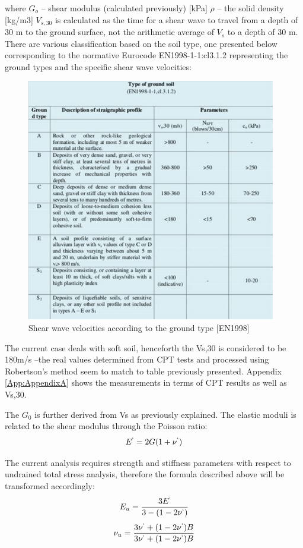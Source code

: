 \documentclass[10pt,a4paper]{report}
\begin{document}
where
$G_o$ – shear modulus (calculated previously) [kPa]
$\rho$ – the solid density [kg/m3]
$V_{s,30}$ is calculated as the time for a shear wave to travel from a depth of 30 m to the ground surface, not the arithmetic average of $V_s$ to a depth of 30 m. There are various classification based on the soil type, one presented below corresponding to the normative Eurocode EN1998-1-1:cl3.1.2 representing the ground types and the specific shear wave velocities:  
\begin{figure}[h!]
	\centering
	\includegraphics[width=0.7\linewidth]{"EC8"}
	\caption{Shear wave velocities according to the ground type [EN1998]}
	\label{EC8}
\end{figure}

The current case deals with soft soil, henceforth the Vs,30 is considered to be 180m/s –the real values determined from CPT tests and processed using Robertson’s method seem to match to table previously presented. Appendix \ref{App:AppendixA} shows the measurements in terms of CPT results as well as Vs,30. 

The $G_0$ is further derived from Vs as previously explained. The elastic moduli is related to the shear modulus through the Poisson ratio:
\begin{equation}
	E^`=2G(1+\nu^`)
\end{equation}

The current analysis requires strength and stiffness parameters with respect to undrained total stress analysis, therefore the formula described above will be transformed accordingly: 
\begin{equation}
	E_u=\frac{3E^`}{3-(1-2\nu^`)}
\end{equation}
\begin{equation}
	\nu_u=\frac{3\nu^`+(1-2\nu^`)B}{3\nu^`+(1-2\nu^`)B}
\end{equation}
	
\end{document}
